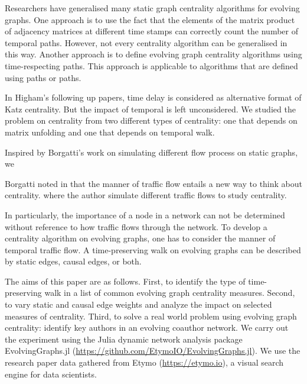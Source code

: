 \documentclass[12pt]{article}
\theoremstyle{definition}
\begin{document}
Researchers have generalised many static graph centrality algorithms for evolving graphs. One approach is to use the fact that the elements of the matrix product of adjacency matrices at different time stamps can correctly count the number of temporal paths.
However, not every centrality algorithm can be generalised in this way. Another approach is to define evolving graph centrality algorithms using time-respecting paths. This approach is applicable to algorithms that are defined using paths or paths.



In Higham's following up papers, time delay is considered as alternative format of Katz centrality.
But the impact of temporal is left unconsidered. We studied the problem on centrality from two different types of centrality: one that depends on matrix unfolding and one that depends on temporal walk.


Inspired by Borgatti's work \cite{borgatti05} on simulating different flow process on static graphs, we


Borgatti noted in  that the manner of traffic flow entails a new way to think about centrality.
where the author simulate different traffic flows to study centrality.

In particularly, the importance of a node in a network can not be determined without reference to how traffic flows through the network.
To develop a centrality algorithm on evolving graphs, one has to consider the manner of temporal traffic flow.
A time-preserving walk on evolving graphs can be described by static edges, causal edges, or both.





The aims of this paper are as follows. First, to identify the type of time-preserving walk in a list of common evolving graph centrality measures. Second, to vary static and causal edge weights and analyze the impact on selected measures of centrality.
Third, to solve a real world problem using evolving graph centrality: identify key authors in an evolving coauthor network.
We carry out the experiment using the Julia dynamic network analysis package
EvolvingGraphs.jl (\url{https://github.com/EtymoIO/EvolvingGraphs.jl}).
We use the research paper data gathered from Etymo (\url{https://etymo.io}), a visual search engine for data scientists.
\end{document}
